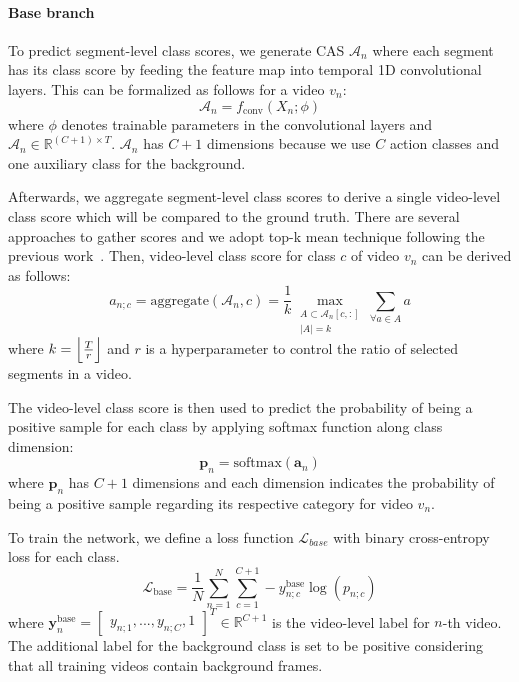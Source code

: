 \documentclass[letterpaper]{article} %
\DeclarePairedDelimiter{\floor}{\lfloor}{\rfloor}
\begin{document}
\paragraph{Base branch}
To predict segment-level class scores, we generate CAS $\mathcal{A}_{n}$ where each segment has its class score by feeding the feature map into temporal 1D convolutional layers. This can be formalized as follows for a video $v_n$:
\begin{equation}
  \label{equ:cas_module}
  \mathcal{A}_{n} = f_{\text{conv}}(X_{n}; \phi)
\end{equation}
where $\phi$ denotes trainable parameters in the convolutional layers and $\mathcal{A}_{n}\in\mathbb{R}^{(C+1) \times T}$. $\mathcal{A}_{n}$ has $C+1$ dimensions because we use $C$ action classes and one auxiliary class for the background.

Afterwards, we aggregate segment-level class scores to derive a single video-level class score which will be compared to the ground truth. There are several approaches to gather scores and we adopt top-k mean technique following the previous work~\cite{wang2017untrimmednets,paul2018w}. Then, video-level class score for class $c$ of video $v_n$ can be derived as follows:
\begin{equation}
  \label{equ:top_k_mean}
  a_{n;c} = \text{aggregate}(\mathcal{A}_{n}, c) = \frac{1}{k} \max_{\substack{A\subset \mathcal{A}_{n}[c,:] \\ |A|=k}} \sum_{\forall a \in A}{a}
\end{equation}
where $ k = \floor[\Big]{\frac{T}{r}} $ and $r$ is a hyperparameter to control the ratio of selected segments in a video.

The video-level class score is then used to predict the probability of being a positive sample for each class by applying softmax function along class dimension:
\begin{equation}
  \label{equ:softmax}
  \mathbf{p}_{n} = \text{softmax}(\mathbf{a}_{n})
\end{equation}
where $\mathbf{p}_{n}$ has $C+1$ dimensions and each dimension indicates the probability of being a positive sample regarding its respective category for video $v_n$.

To train the network, we define a loss function $\mathcal{L}_{base}$ with binary cross-entropy loss for each class.
\begin{equation}
  \label{equ:loss_base}
  \mathcal{L}_{\text{base}} = \frac{1}{N}\sum_{n=1}^{N}\sum_{c=1}^{C+1}-y^{\text{base}}_{n;c}\log(p_{n;c})
\end{equation}
where $\mathbf{y}^{\text{base}}_{n} = \begin{bmatrix}y_{n;1}, ..., y_{n;C}, 1\end{bmatrix}^{T} \in \mathbb{R}^{C+1}$ is the video-level label for $n$-th video. The additional label for the background class is set to be positive considering that all training videos contain background frames.
\end{document}
